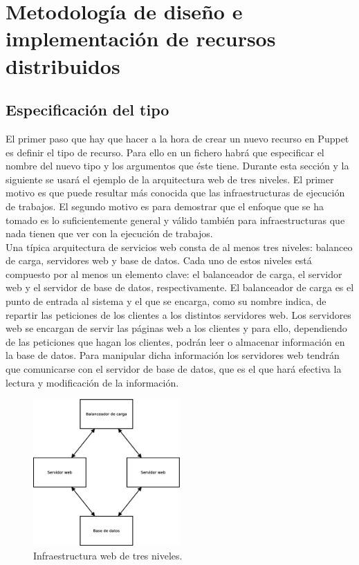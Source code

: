 \chapter{Metodología de diseño e implementación de recursos distribuidos}
\label{cap:metodologia}


\section{Especificación del tipo}

El primer paso que hay que hacer a la hora de crear un nuevo recurso en Puppet es definir el tipo de recurso. Para ello en un fichero habrá que especificar el nombre del nuevo tipo y los argumentos que éste tiene. Durante esta sección y la siguiente se usará el ejemplo de la arquitectura web de tres niveles. El primer motivo es que puede resultar más conocida que las infraestructuras de ejecución de trabajos. El segundo motivo es para demostrar que el enfoque que se ha tomado es lo suficientemente general y válido también para infraestructuras que nada tienen que ver con la ejecución de trabajos. \\

Una típica arquitectura de servicios web consta de al menos tres niveles: balanceo de carga, servidores web y base de datos. Cada uno de estos niveles está compuesto por al menos un elemento clave: el balanceador de carga, el servidor web y el servidor de base de datos, respectivamente. El balanceador de carga es el punto de entrada al sistema y el que se encarga, como su nombre indica, de repartir las peticiones de los clientes a los distintos servidores web. Los servidores web se encargan de servir las páginas web a los clientes y para ello, dependiendo de las peticiones que hagan los clientes, podrán leer o almacenar información en la base de datos. Para manipular dicha información los servidores web tendrán que comunicarse con el servidor de base de datos, que es el que hará efectiva la lectura y modificación de la información.\\

\begin{figure} [!htbp]
  \centering
  \includegraphics[width=0.5\textwidth]{figuras/Arquitectura_Web2.eps}
  \caption{Infraestructura web de tres niveles.}
\label{figure:arquitectura-web}
\end{figure}

